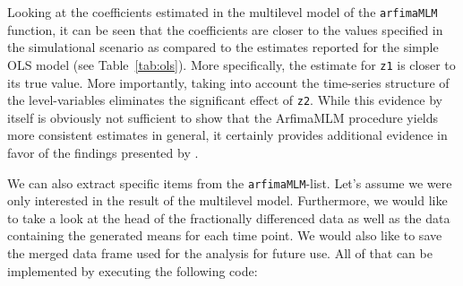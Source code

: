 \documentclass[12pt]{paper}\usepackage[]{graphicx}\usepackage[]{color}
\begin{document}
Looking at the coefficients estimated in the multilevel model of the \texttt{arfimaMLM} function, it can be seen that the coefficients are closer to the values specified in the simulational scenario as compared to the estimates reported for the simple OLS model (see Table~\ref{tab:ols}). More specifically, the estimate for \texttt{z1} is closer to its true value. More importantly, taking into account the time-series structure of the level-variables eliminates the significant effect of \texttt{z2}. While this evidence by itself is obviously not sufficient to show that the ArfimaMLM procedure yields more consistent estimates in general, it certainly provides additional evidence in favor of the findings presented by \citet{lebo2015effective}.

We can also extract specific items from the \texttt{arfimaMLM}-list. Let's assume we were only interested in the result of the multilevel model. Furthermore, we would like to take a look at the head of the fractionally differenced data as well as the data containing the generated means for each time point. We would also like to save the merged data frame used for the analysis for future use. All of that can be implemented by executing the following code:
\end{document}

